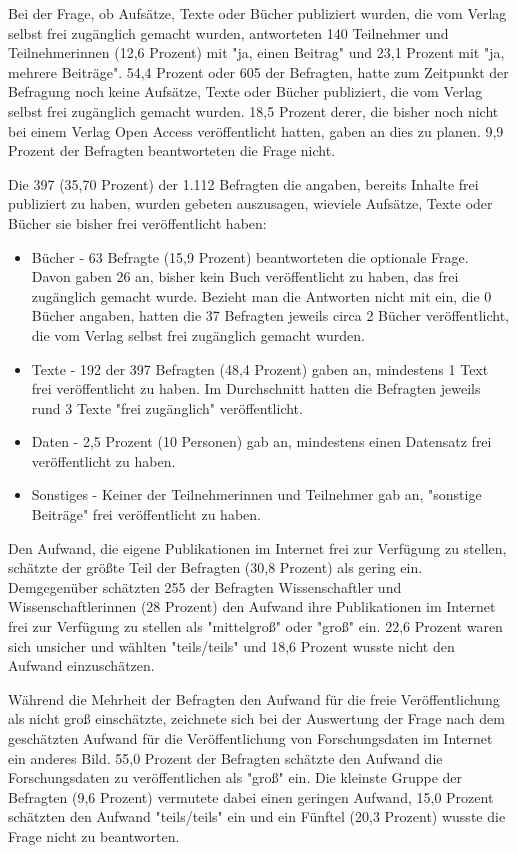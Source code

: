 Bei der Frage, ob Aufsätze, Texte oder Bücher publiziert wurden, die vom Verlag selbst frei zugänglich gemacht wurden, antworteten 140 Teilnehmer und Teilnehmerinnen (12,6 Prozent) mit "ja, einen Beitrag" und 23,1 Prozent mit "ja, mehrere Beiträge". 54,4 Prozent oder 605 der Befragten, hatte zum Zeitpunkt der Befragung noch keine Aufsätze, Texte oder Bücher publiziert, die vom Verlag selbst frei zugänglich gemacht wurden.  18,5 Prozent derer, die bisher noch nicht bei einem Verlag Open Access veröffentlicht hatten, gaben an dies zu planen. 9,9 Prozent der Befragten beantworteten die Frage nicht.

Die 397 (35,70 Prozent) der 1.112 Befragten die angaben, bereits Inhalte frei publiziert zu haben, wurden gebeten auszusagen, wieviele Aufsätze, Texte oder Bücher sie bisher frei veröffentlicht haben:
\begin{itemize}
\item Bücher - 63 Befragte (15,9 Prozent) beantworteten die optionale Frage. Davon gaben 26 an, bisher kein Buch veröffentlicht zu haben, das frei zugänglich gemacht wurde. Bezieht man die Antworten nicht mit ein, die 0 Bücher angaben, hatten die 37 Befragten jeweils circa 2 Bücher veröffentlicht, die vom Verlag selbst frei zugänglich gemacht wurden.
\item Texte - 192 der 397 Befragten (48,4 Prozent) gaben an, mindestens 1 Text frei veröffentlicht zu haben. Im Durchschnitt hatten die Befragten jeweils rund 3 Texte "frei zugänglich" veröffentlicht.
\item Daten - 2,5 Prozent (10 Personen) gab an, mindestens einen Datensatz frei veröffentlicht zu haben.
\item Sonstiges - Keiner der Teilnehmerinnen und Teilnehmer gab an, "sonstige Beiträge" frei veröffentlicht zu haben.
\end{itemize}

Den Aufwand, die eigene Publikationen im Internet frei zur Verfügung zu stellen, schätzte der größte Teil der Befragten (30,8 Prozent) als gering ein. Demgegenüber schätzten 255 der Befragten Wissenschaftler und Wissenschaftlerinnen (28 Prozent) den Aufwand ihre Publikationen im Internet frei zur Verfügung zu stellen als "mittelgroß" oder "groß" ein. 22,6 Prozent waren sich unsicher und wählten "teils/teils" und 18,6 Prozent wusste nicht den Aufwand einzuschätzen.

Während die Mehrheit der Befragten den Aufwand für die freie Veröffentlichung als nicht groß einschätzte, zeichnete sich bei der Auswertung der Frage nach dem geschätzten Aufwand für die Veröffentlichung von Forschungsdaten im Internet ein anderes Bild. 55,0 Prozent der Befragten schätzte den Aufwand die Forschungsdaten zu veröffentlichen als "groß" ein. Die kleinste Gruppe der Befragten (9,6 Prozent) vermutete dabei einen geringen Aufwand, 15,0 Prozent schätzten den Aufwand "teils/teils" ein und ein Fünftel (20,3 Prozent) wusste die Frage nicht zu beantworten.

